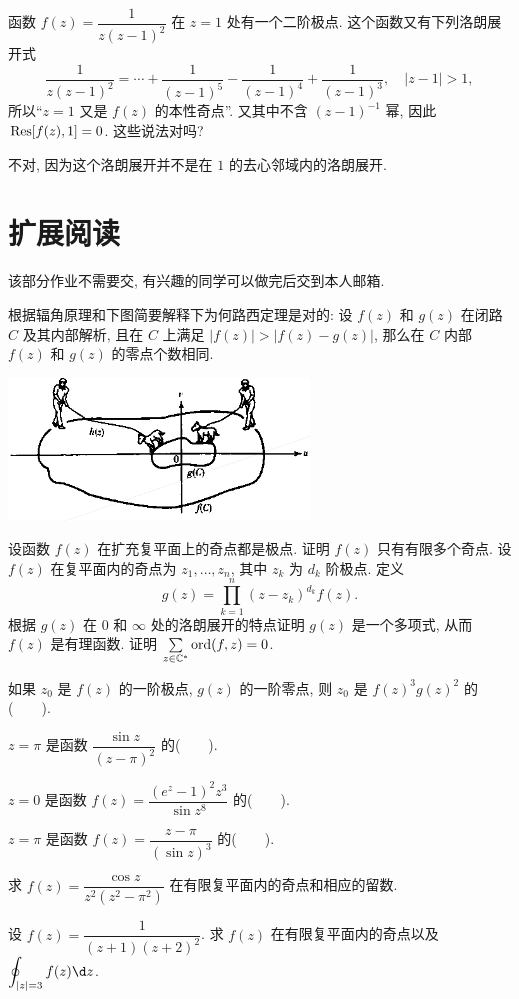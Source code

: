 \begin{exercise}
	函数 $f(z)=\dfrac1{z(z-1)^2}$ 在 $z=1$ 处有一个二阶极点. 这个函数又有下列洛朗展开式
	\[\frac1{z(z-1)^2}=\cdots+\frac1{(z-1)^5}-\frac1{(z-1)^4}+\frac1{(z-1)^3},\quad|z-1|>1,\]
	所以``$z=1$ 又是 $f(z)$ 的本性奇点''. 又其中不含 $(z-1)^{-1}$ 幂, 因此 ${\mathrm{Res}}[f(z),1]=0$. 这些说法对吗?
	\end{exercise}
	\begin{solution}
	不对, 因为这个洛朗展开并不是在 $1$ 的去心邻域内的洛朗展开.
	\end{solution}
		


\section*{扩展阅读}
该部分作业不需要交, 有兴趣的同学可以做完后交到本人邮箱.
\begin{exercise}
	根据辐角原理和下图简要解释下为何路西定理是对的: 设 $f(z)$ 和 $g(z)$ 在闭路 $C$ 及其内部解析, 且在 $C$ 上满足 $|f(z)|>|f(z)-g(z)|$, 那么在 $C$ 内部 $f(z)$ 和 $g(z)$ 的零点个数相同.
	\begin{center}
	\includegraphics[width=8cm]{rouche.png}
	\end{center}
\end{exercise}


\begin{exercise}
	设函数 $f(z)$ 在扩充复平面上的奇点都是极点.
	\subex 证明 $f(z)$ 只有有限多个奇点.
	\subex 设 $f(z)$ 在复平面内的奇点为 $z_1,\dots,z_n$, 其中 $z_k$ 为 $d_k$ 阶极点. 定义
	\[g(z)=\prod_{k=1}^n(z-z_k)^{d_k}f(z).\]
	根据 $g(z)$ 在 $0$ 和 $\infty$ 处的洛朗展开的特点证明 $g(z)$ 是一个多项式, 从而 $f(z)$ 是有理函数.
	\subex 证明 $\sum\limits_{z\in{\mathbb{C}}^*}{\mathrm{ord}}(f,z)=0$.
\end{exercise}







\item 如果 $z_0$ 是 $f(z)$ 的一阶极点, $g(z)$ 的一阶零点, 则 $z_0$ 是 $f(z)^3g(z)^2$ 的(~~~~).
\item $z=\pi$ 是函数 $\dfrac{\sin z}{(z-\pi)^2}$ 的(~~~~).
\item $z=0$ 是函数 $f(z)=\dfrac{(e^z-1)^2z^3}{\sin z^8}$ 的(~~~~).
\item $z=\pi$ 是函数 $f(z)=\dfrac{z-\pi}{(\sin z)^3}$ 的(~~~~).
\item 求 $f(z)=\dfrac{\cos z}{z^2(z^2-\pi^2)}$ 在有限复平面内的奇点和相应的留数.
\item 设 $f(z)=\dfrac{1}{(z+1)(z+2)^2}$. 求 $f(z)$ 在有限复平面内的奇点以及 $\displaystyle\oint_{|z|=3}f(z)\d z$.


